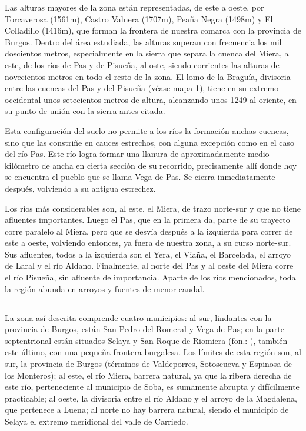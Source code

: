 \documentclass[11pt,spanish,b5paper]{book}
\begin{document}
Las alturas mayores de la zona están representadas, de este a oeste, por Torcaverosa (1561m), Castro Valnera (1707m), Peaña Negra (1498m) y El Colladillo (1416m), que forman la frontera de nuestra comarca con la provincia de Burgos. Dentro del área estudiada, las alturas superan con frecuencia los mil doscientos metros, especialmente en la sierra que separa la cuenca del Miera, al este, de los ríos de Pas y de Pisueña, al oste, siendo corrientes las alturas de novecientos metros en todo el resto de la zona. El lomo de la Braguía, divisoria entre las cuencas del Pas y del Pisueña (véase mapa 1), tiene en su extremo occidental unos setecientos metros de altura, alcanzando unos 1249 al oriente, en su punto de unión con la sierra antes citada. 

Esta configuración del suelo no permite a los ríos la formación anchas cuencas, sino que las constriñe en cauces estrechos, con alguna excepción como en el caso del río Pas. Este río logra formar una llanura de aproximadamente medio kilómetro de ancha en cierta sección de su recorrido, precisamente allí donde hoy se encuentra el pueblo que se llama Vega de Pas. Se cierra inmediatamente después, volviendo a su antigua estrechez. 

Los ríos más considerables son, al este, el Miera, de trazo norte-sur y que no tiene afluentes importantes. Luego el Pas, que en la primera da, parte de su trayecto corre paralelo al Miera, pero que se desvía después a la izquierda para correr de este a oeste, volviendo entonces, ya fuera de nuestra zona, a su curso norte-sur. Sus afluentes, todos a la izquierda son el Yera, el Viaña, el Barcelada, el arroyo de Laral y el río Aldano. Finalmente, al norte del Pas y al oeste del Miera corre el río Pisueña, sin afluente de importancia. Aparte de los ríos mencionados, toda la región abunda en arroyos y fuentes de menor caudal. 

\subsection{} La zona así descrita comprende cuatro municipios: al sur, lindantes con la provincia de Burgos, están San Pedro del Romeral y Vega de Pas; en la parte septentrional están situados Selaya y San Roque de Riomiera (fon.: ), también este último, con una pequeña frontera burgalesa. Los límites de esta región son, al sur, la provincia de Burgos (términos de Valdeporres, Sotoscueva y Espinosa de los Monteros); al este, el río Miera, barrera natural, ya que la ribera derecha de este río, perteneciente al municipio de Soba, es sumamente abrupta y difícilmente practicable; al oeste, la divisoria entre el río Aldano y el arroyo de la Magdalena, que pertenece a Luena; al norte no hay barrera natural, siendo el municipio de Selaya el extremo meridional del valle de Carriedo. 
\end{document}
